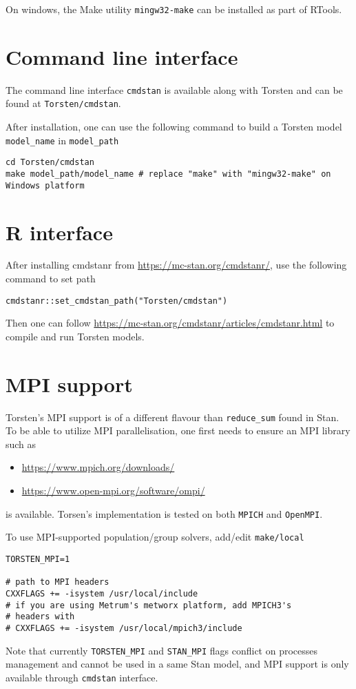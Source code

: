 \documentclass[12pt, reqno, oneside]{amsbook}
\numberwithin{equation}{chapter}
\numberwithin{figure}{chapter}
\numberwithin{table}{chapter}
\theoremstyle{remark}
\begin{document}
On windows, the Make utility \texttt{mingw32-make} can be installed as part
of RTools.

\section{Command line interface}
\label{sec:org703adfa}
The command line interface \texttt{cmdstan} is available along with Torsten
and can be found at \texttt{Torsten/cmdstan}.

After installation, one can use the following command to build a Torsten model \texttt{model\_name} in \texttt{model\_path}
\begin{verbatim}
cd Torsten/cmdstan
make model_path/model_name # replace "make" with "mingw32-make" on Windows platform
\end{verbatim}

\section{R interface}
\label{sec:org5de6f78}
After installing cmdstanr from \url{https://mc-stan.org/cmdstanr/}, use the
following command to set path
\begin{verbatim}
cmdstanr::set_cmdstan_path("Torsten/cmdstan")
\end{verbatim}
Then one can follow \url{https://mc-stan.org/cmdstanr/articles/cmdstanr.html} to compile
and run Torsten models.

\section{MPI support}
\label{mpi-support}
Torsten's MPI support is of a different flavour than
\texttt{reduce\_sum} found in Stan. To be able to utilize MPI
parallelisation, one first needs to ensure an MPI library
such as
\begin{itemize}
\item \url{https://www.mpich.org/downloads/}
\item \url{https://www.open-mpi.org/software/ompi/}
\end{itemize}
is available. Torsen's implementation is tested on
both \texttt{MPICH} and \texttt{OpenMPI}.

To use MPI-supported population/group solvers,
add/edit \texttt{make/local}
\begin{verbatim}
TORSTEN_MPI=1

# path to MPI headers
CXXFLAGS += -isystem /usr/local/include
# if you are using Metrum's metworx platform, add MPICH3's
# headers with
# CXXFLAGS += -isystem /usr/local/mpich3/include
\end{verbatim}
Note that currently \texttt{TORSTEN\_MPI} and \texttt{STAN\_MPI} flags
conflict on processes management and cannot be used in a
same Stan model, and MPI support is only available through \texttt{cmdstan}
interface.
\end{document}
